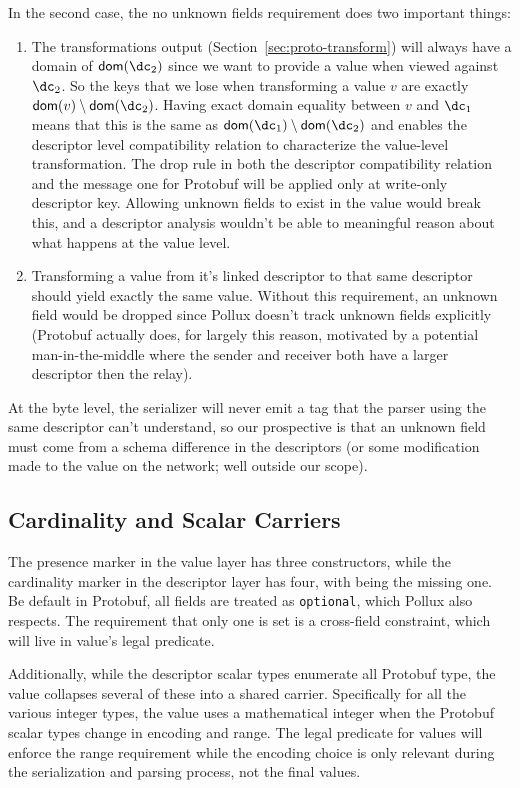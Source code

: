 In the second case, the no unknown fields requirement does two important
things:

\begin{enumerate}
\item The transformations output (Section~\ref{sec:proto-transform}) will always
  have a domain of $\dom{\dc_2}$ since we want to provide a value when viewed
  against $\dc_2$. So the keys that we lose when transforming a value $v$ are
  exactly $\dom{v} \setminus \dom{\dc_2}$. Having exact domain equality between
  $v$ and $\dc_1$ means that this is the same as $\dom{\dc_1} \setminus \dom{\dc_2}$
  and enables the descriptor level compatibility relation to characterize the
  value-level transformation. The drop rule in both the descriptor compatibility
  relation and the message one for Protobuf will be applied only at write-only
  descriptor key. Allowing unknown fields to exist in the value would break
  this, and a descriptor analysis wouldn't be able to meaningful reason about
  what happens at the value level.
\item Transforming a value from it's linked descriptor to that same descriptor
  should yield exactly the same value. Without this requirement, an unknown field
  would be dropped since Pollux doesn't track unknown fields explicitly
  (Protobuf actually does, for largely this reason, motivated by a potential
  man-in-the-middle where the sender and receiver both have a larger descriptor
  then the relay).
\end{enumerate}

At the byte level, the serializer will never emit a tag that the parser using
the same descriptor can't understand, so our prospective is that an unknown
field must come from a schema difference in the descriptors (or some
modification made to the value on the network; well outside our scope).

\subsection{Cardinality and Scalar Carriers}

The presence marker in the value layer has three constructors, while the
cardinality marker in the descriptor layer has four, with \Oneof{} being
the missing one. Be default in Protobuf, all \Oneof{} fields are treated
as \texttt{optional}, which Pollux also respects. The requirement that only one
is set is a cross-field constraint, which will live in value's legal predicate.

Additionally, while the descriptor scalar types enumerate all Protobuf type, the
value collapses several of these into a shared carrier. Specifically for all the
various integer types, the value uses a mathematical integer when the Protobuf
scalar types change in encoding and range. The legal predicate for values will
enforce the range requirement while the encoding choice is only relevant
during the serialization and parsing process, not the final values.


